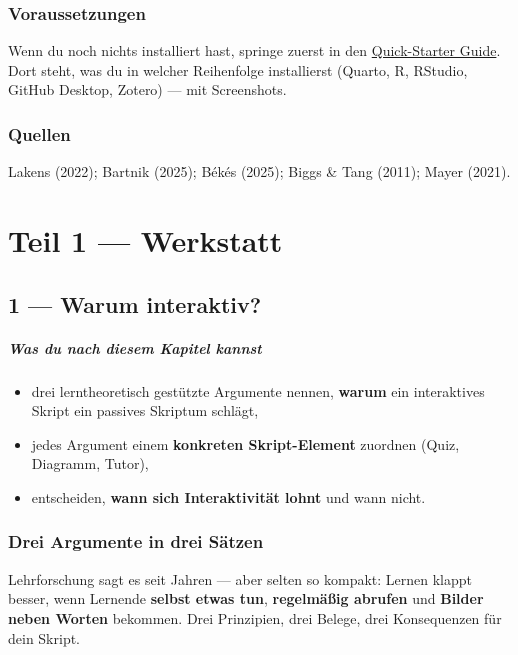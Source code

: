 \documentclass[
  ngerman,
  a4paper,
  DIV=11]{scrreprt}
\providecommand{\tightlist}{%
  \setlength{\itemsep}{0pt}\setlength{\parskip}{0pt}}
\begin{document}
\section{Voraussetzungen}\label{voraussetzungen}

Wenn du noch nichts installiert hast, springe zuerst in den
\href{appendix/quickstart.qmd}{Quick-Starter Guide}. Dort steht, was du
in welcher Reihenfolge installierst (Quarto, R, RStudio, GitHub Desktop,
Zotero) --- mit Screenshots.

\section{Quellen}\label{quellen}

Lakens (2022); Bartnik (2025); Békés (2025); Biggs \& Tang (2011); Mayer
(2021).

\part{Teil 1 --- Werkstatt}

\chapter{1 --- Warum interaktiv?}\label{warum-interaktiv}

\subsubsection{Was du nach diesem Kapitel
kannst}\label{was-du-nach-diesem-kapitel-kannst}

\begin{itemize}
\tightlist
\item
  drei lerntheoretisch gestützte Argumente nennen, \textbf{warum} ein
  interaktives Skript ein passives Skriptum schlägt,
\item
  jedes Argument einem \textbf{konkreten Skript-Element} zuordnen (Quiz,
  Diagramm, Tutor),
\item
  entscheiden, \textbf{wann sich Interaktivität lohnt} und wann nicht.
\end{itemize}

\section{Drei Argumente in drei
Sätzen}\label{drei-argumente-in-drei-suxe4tzen}

Lehrforschung sagt es seit Jahren --- aber selten so kompakt: Lernen
klappt besser, wenn Lernende \textbf{selbst etwas tun},
\textbf{regelmäßig abrufen} und \textbf{Bilder neben Worten} bekommen.
Drei Prinzipien, drei Belege, drei Konsequenzen für dein Skript.
\end{document}
